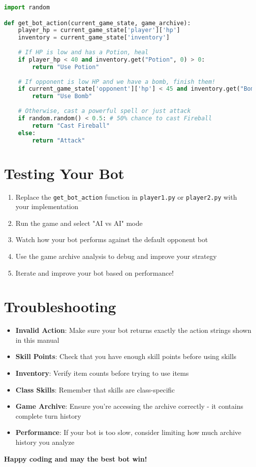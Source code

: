 \documentclass[12pt]{article}
\begin{document}
\begin{lstlisting}[language=Python, caption=Example Bot Implementation]
import random

def get_bot_action(current_game_state, game_archive):
    player_hp = current_game_state['player']['hp']
    inventory = current_game_state['inventory']
    
    # If HP is low and has a Potion, heal
    if player_hp < 40 and inventory.get("Potion", 0) > 0:
        return "Use Potion"
    
    # If opponent is low HP and we have a bomb, finish them!
    if current_game_state['opponent']['hp'] < 45 and inventory.get("Bomb", 0) > 0:
        return "Use Bomb"
        
    # Otherwise, cast a powerful spell or just attack
    if random.random() < 0.5: # 50% chance to cast Fireball
        return "Cast Fireball"
    else:
        return "Attack"
\end{lstlisting}

\section{Testing Your Bot}
\label{sec:testing}

\begin{enumerate}
    \item Replace the \texttt{get\_bot\_action} function in \texttt{player1.py} or \texttt{player2.py} with your implementation
    \item Run the game and select "AI vs AI" mode
    \item Watch how your bot performs against the default opponent bot
    \item Use the game archive analysis to debug and improve your strategy
    \item Iterate and improve your bot based on performance!
\end{enumerate}

\section{Troubleshooting}
\label{sec:troubleshooting}

\begin{itemize}
    \item \textbf{Invalid Action}: Make sure your bot returns exactly the action strings shown in this manual
    \item \textbf{Skill Points}: Check that you have enough skill points before using skills
    \item \textbf{Inventory}: Verify item counts before trying to use items
    \item \textbf{Class Skills}: Remember that skills are class-specific
    \item \textbf{Game Archive}: Ensure you're accessing the archive correctly - it contains complete turn history
    \item \textbf{Performance}: If your bot is too slow, consider limiting how much archive history you analyze
\end{itemize}

\begin{center}
\Large\textbf{Happy coding and may the best bot win!}
\end{center}
\end{document}
